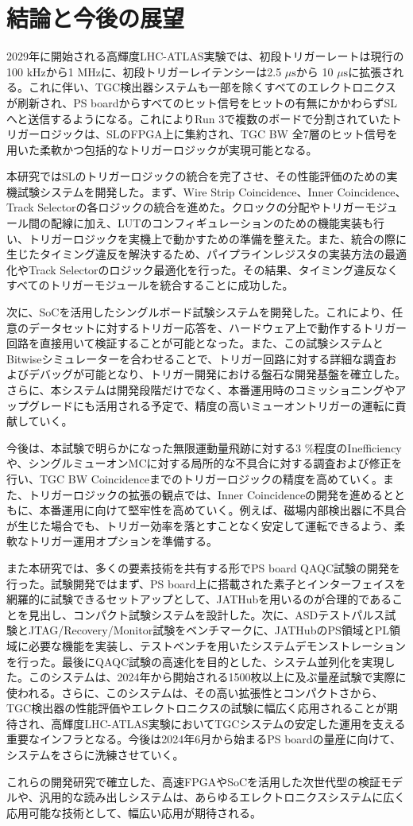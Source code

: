 \chapter{結論と今後の展望}
\label{chap_conclusion}

2029年に開始される高輝度LHC-ATLAS実験では、初段トリガーレートは現行の100 kHzから1 MHzに、初段トリガーレイテンシーは2.5 $\mu\mathrm{s}$から 10 $\mu\mathrm{s}$に拡張される。これに伴い、TGC検出器システムも一部を除くすべてのエレクトロニクスが刷新され、PS boardからすべてのヒット信号をヒットの有無にかかわらずSLへと送信するようになる。これによりRun 3で複数のボードで分割されていたトリガーロジックは、SLのFPGA上に集約され、TGC BW 全7層のヒット信号を用いた柔軟かつ包括的なトリガーロジックが実現可能となる。

本研究ではSLのトリガーロジックの統合を完了させ、その性能評価のための実機試験システムを開発した。まず、Wire Strip Coincidence、Inner Coincidence、Track Selectorの各ロジックの統合を進めた。クロックの分配やトリガーモジュール間の配線に加え、LUTのコンフィギュレーションのための機能実装も行い、トリガーロジックを実機上で動かすための準備を整えた。また、統合の際に生じたタイミング違反を解決するため、パイプラインレジスタの実装方法の最適化やTrack Selectorのロジック最適化を行った。その結果、タイミング違反なくすべてのトリガーモジュールを統合することに成功した。

次に、SoCを活用したシングルボード試験システムを開発した。これにより、任意のデータセットに対するトリガー応答を、ハードウェア上で動作するトリガー回路を直接用いて検証することが可能となった。また、この試験システムとBitwiseシミュレーターを合わせることで、トリガー回路に対する詳細な調査およびデバッグが可能となり、トリガー開発における盤石な開発基盤を確立した。
さらに、本システムは開発段階だけでなく、本番運用時のコミッショニングやアップグレードにも活用される予定で、精度の高いミューオントリガーの運転に貢献していく。

今後は、本試験で明らかになった無限運動量飛跡に対する3 \%程度のInefficiencyや、シングルミューオンMCに対する局所的な不具合に対する調査および修正を行い、TGC BW Coincidenceまでのトリガーロジックの精度を高めていく。また、トリガーロジックの拡張の観点では、Inner Coincidenceの開発を進めるとともに、本番運用に向けて堅牢性を高めていく。例えば、磁場内部検出器に不具合が生じた場合でも、トリガー効率を落とすことなく安定して運転できるよう、柔軟なトリガー運用オプションを準備する。

また本研究では、多くの要素技術を共有する形でPS board QAQC試験の開発を行った。試験開発ではまず、PS board上に搭載された素子とインターフェイスを網羅的に試験できるセットアップとして、JATHubを用いるのが合理的であることを見出し、コンパクト試験システムを設計した。次に、ASDテストパルス試験とJTAG/Recovery/Monitor試験をベンチマークに、JATHubのPS領域とPL領域に必要な機能を実装し、テストベンチを用いたシステムデモンストレーションを行った。最後にQAQC試験の高速化を目的とした、システム並列化を実現した。このシステムは、2024年から開始される1500枚以上に及ぶ量産試験で実際に使われる。さらに、このシステムは、その高い拡張性とコンパクトさから、TGC検出器の性能評価やエレクトロニクスの試験に幅広く応用されることが期待され、高輝度LHC-ATLAS実験においてTGCシステムの安定した運用を支える重要なインフラとなる。今後は2024年6月から始まるPS boardの量産に向けて、システムをさらに洗練させていく。

これらの開発研究で確立した、高速FPGAやSoCを活用した次世代型の検証モデルや、汎用的な読み出しシステムは、あらゆるエレクトロニクスシステムに広く応用可能な技術として、幅広い応用が期待される。




